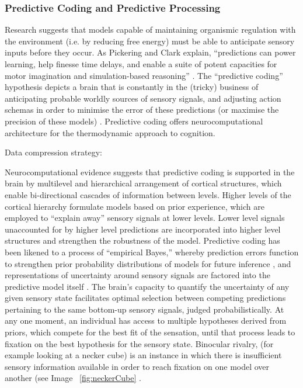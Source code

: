 \begin{CJK}{UTF8}{gbsn}
\subsubsection{Predictive Coding and Predictive Processing}
Research suggests that models capable of maintaining organismic regulation with the environment (i.e. by reducing free energy) must be able to anticipate sensory inputs before they occur. As Pickering and Clark explain, ``predictions can power learning, help finesse time delays, and enable a suite of potent capacities for motor imagination and simulation-based reasoning'' \citep[6]{Pickering2014}.  The ``predictive coding'' hypothesis depicts a brain that is constantly in the (tricky) business of anticipating probable worldly sources of sensory signals, and adjusting action schemas in order to minimise the error of these predictions (or maximise the precision of these models) \citep{Friston2010,Clark2013}. Predictive coding offers neurocomputational architecture for the thermodynamic approach to cognition.

Data compression strategy:

Neurocomputational evidence suggests that predictive coding is supported in the brain by multilevel and hierarchical arrangement of cortical structures, which enable bi-directional cascades of information between levels.  Higher levels of the cortical hierarchy formulate models based on prior experience, which are employed to ``explain away'' sensory signals at lower levels. Lower level signals unaccounted for by higher level predictions are incorporated into higher level structures and strengthen the robustness of the model.  Predictive coding has been likened to a process of ``empirical Bayes,'' whereby prediction errors function to strengthen prior probability distributions of models for future inference \citep{Robbins1964}, and representations of uncertainty around sensory signals are factored into the predictive model itself \citep{Clark2013}.  The brain's capacity to quantify the uncertainty of any given sensory state facilitates optimal selection between competing predictions pertaining to the same bottom-up sensory signals, judged probabilistically.  At any one moment, an individual has access to multiple hypotheses derived from priors, which compete for the best fit of the sensation, until that process leads to fixation on the best hypothesis for the sensory state.
Binocular rivalry, (for example looking at a necker cube) is an instance in which there is insufficient sensory information available in order to reach fixation on one model over another (see Image ~\ref{fig:neckerCube} \citep{Frith2007}.


\end{CJK}

